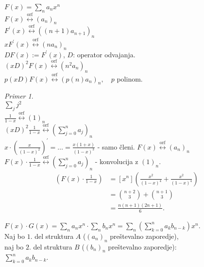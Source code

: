 \documentclass[a4paper, 12pt]{book}
\theoremstyle{definition}
\theoremstyle{remark}
\newtheorem*{ex}{Primer}
\begin{document}
$F(x) = \sum_n a_n x^n$ \\
$F(x) \stackrel{\text{orf}}{\longleftrightarrow} (a_n)_n$ \\
$F^{'}(x) \stackrel{\text{orf}}{\longleftrightarrow} ((n+1) a_{n+1})_n$ \\
$x F^{'}(x) \stackrel{\text{orf}}{\longleftrightarrow} (n a_n)_n$ \\
$D F(x) := F^{'}(x)$, $D$: operator odvajanja. \\
$(x D)^2 F(x) \stackrel{\text{orf}}{\longleftrightarrow} (n^2 a_n)_n$ \\
$p(x D) F(x) \stackrel{\text{orf}}{\longleftrightarrow} (p(n) a_n)_n, \quad p$ polinom.
\begin{ex} \text{} \\
  $\sum_j j^2$ \\
  $\frac{1}{1-x} \stackrel{\text{orf}}{\longleftrightarrow} (1)_n$ \\
  $(x D)^2 \frac{1}{1-x} \stackrel{\text{orf}}{\longleftrightarrow} \left(\sum_{j=0}^n a_j\right)_n$ \\
  $x \cdot \left(\frac{x}{(1-x)^2}\right)^{'} = \dots = \frac{x(1+x)}{(1-x)^3}$ - samo členi.
  $F(x) \stackrel{\text{orf}}{\longleftrightarrow} (a_n)_n$ \\
  $F(x) \cdot \frac{1}{1-x} \stackrel{\text{orf}}{\longleftrightarrow} \left(\sum_{j=0}^{n} a_j\right)_n$
    - konvolucija z $(1)_n$. \\
  \begin{align*}
    [X^n] \left(F(x) \cdot \frac{1}{1-x}\right) &= [x^n] \left(\frac{x^2}{(1-x)^4} + \frac{x^2}{(1-x)^4}\right) \\
    &= \binom{n+2}{3} + \binom{n+1}{3} \\
    &= \frac{n(n+1)(2n+1)}{6}.
  \end{align*}
\end{ex}
$F(x) \cdot G(x) = \sum_n a_n x^n \cdot \sum_n b_n x^n = \sum_n \left(\sum_{k=0}^{n} a_k b_{n-k}\right) x^n$. \\
Naj bo $1.$ del struktura $A$ ($(a_n)_n$ preštevalno zaporedje), \\
naj bo $2.$ del struktura $B$ ($(b_n)_n$ preštevalno zaporedje): \\
$\sum_{k=0}^n a_k b_{n-k}$.
\end{document}
